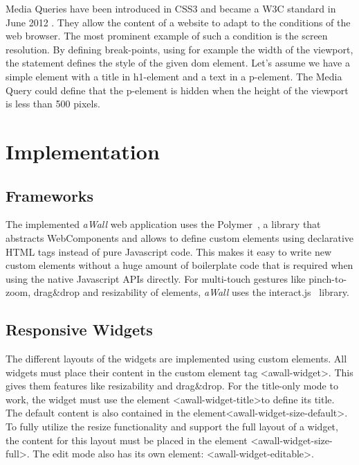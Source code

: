 \documentclass{sigchi}
\begin{document}
Media Queries have been introduced in CSS3 and became a W3C standard in June 2012 \cite{mediaqueriesW3C}.
They allow the content of a website to adapt to the conditions of the web browser.
The most prominent example of such a condition is the screen resolution.
By defining break-points, using for example the width of the viewport, the statement defines the style of the given \gls{dom} element.
Let's assume we have a simple element with a title in h1-element and a text in a p-element.
The Media Query could define that the p-element is hidden when the height of the viewport is less than 500 pixels.


\section{Implementation}
\subsection{Frameworks}
The implemented \textit{aWall} web application uses the Polymer~\cite{polymer}, a library that abstracts WebComponents and allows to define custom elements using declarative HTML tags instead of pure Javascript code.
This makes it easy to write new custom elements without a huge amount of boilerplate code that is required when using the native Javascript APIs directly.
For multi-touch gestures like pinch-to-zoom, drag\&drop and resizability of elements, \textit{aWall} uses the interact.js~\cite{interactJs} library.

\subsection{Responsive Widgets}
The different layouts of the widgets are implemented using custom elements.
All widgets must place their content in the custom element tag \textless{}awall-widget\textgreater.
This gives them features like resizability and drag\&drop.
For the title-only mode to work, the widget must use the element \textless{}awall-widget-title\textgreater to define its title.
The default content is also contained in the element\textless{}awall-widget-size-default\textgreater.
To fully utilize the resize functionality and support the full layout of a widget, the content for this layout must be placed in the element \textless{}awall-widget-size-full\textgreater.
The edit mode also has its own element: \textless{}awall-widget-editable\textgreater.
\end{document}
